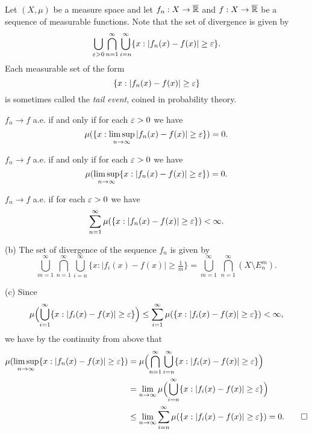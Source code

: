 \documentclass{../../large}
\begin{document}
\begin{prb}
Let $(X,\mu)$ be a measure space and let $f_n:X\to\overline{\mathbb{R}}$ and $f:X\to\overline{\mathbb{R}}$ be a sequence of measurable functions.
Note that the set of divergence is given by
\[\bigcup_{\varepsilon>0}\bigcap_{n=1}^\infty\bigcup_{i=n}^\infty\{x:|f_n(x)-f(x)|\ge\varepsilon\}.\]
Each measurable set of the form
\[\{x:|f_n(x)-f(x)|\ge\varepsilon\}\]
is sometimes called the \emph{tail event}, coined in probability theory.
\begin{parts}
\item $f_n\to f$ a.e. if and only if for each $\varepsilon>0$ we have
\[\mu(\{x:\limsup_{n\to\infty}|f_n(x)-f(x)|\ge\varepsilon\})=0.\]
\item $f_n\to f$ a.e. if and only if for each $\varepsilon>0$ we have
\[\mu(\limsup_{n\to\infty}\{x:|f_n(x)-f(x)|\ge\varepsilon\})=0.\]
\item $f_n\to f$ a.e. if for each $\varepsilon>0$ we have
\[\sum_{n=1}^\infty\mu(\{x:|f_n(x)-f(x)|\ge\varepsilon\})<\infty.\]
\end{parts}
\end{prb}
\begin{pf}
(b)
The set of divergence of the sequence $f_n$ is given by
\[\bigcup_{m=1}^\infty\bigcap_{n=1}^\infty\bigcup_{i=n}^\infty\{x:|f_i(x)-f(x)|\ge\tfrac1m\}=\bigcup_{m=1}^\infty\,\bigcap_{n=1}^\infty(X\setminus E_n^m).\]

(c)
Since
\[\mu\Bigl(\bigcup_{i=1}^\infty\{x:|f_i(x)-f(x)|\ge\varepsilon\}\Bigr)\le\sum_{i=1}^\infty\mu(\{x:|f_i(x)-f(x)|\ge\varepsilon\})<\infty,\]
we have by the continuity from above that
\begin{align*}
\mu(\limsup_{n\to\infty}\{x:|f_n(x)-f(x)|\ge\varepsilon\})
&=\mu\Bigl(\bigcap_{n=1}^\infty\bigcup_{i=n}^\infty\{x:|f_i(x)-f(x)|\ge\varepsilon\}\Bigr)\\
&=\lim_{n\to\infty}\mu\Bigl(\bigcup_{i=n}^\infty\{x:|f_i(x)-f(x)|\ge\varepsilon\}\Bigr)\\
&\le\lim_{n\to\infty}\sum_{i=n}^\infty\mu(\{x:|f_i(x)-f(x)|\ge\varepsilon\})
=0.\qedhere
\end{align*}
\end{pf}
\end{document}

